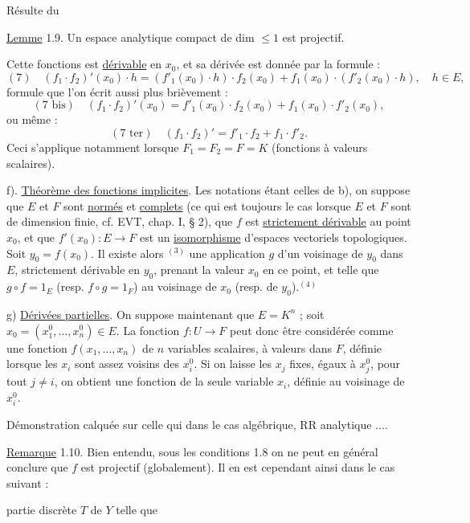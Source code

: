 Résulte du

\uline{Lemme} 1.9. Un espace analytique compact de dim $\leq 1$ est projectif.


Cette fonctions est \uline{dérivable} en $x_0$, et sa dérivée est donnée par la formule :
\[
(7)\quad (f_1\cdot f_2)'(x_0)\cdot h=(f'_1(x_0)\cdot h)\cdot f_2(x_0)+f_1(x_0)\cdot(f'_2(x_0)\cdot h),\quad h\in E,
\]
formule que l'on écrit aussi plus brièvement :
\[
(7\text{ bis})\quad (f_1\cdot f_2)'(x_0)=f'_1(x_0)\cdot f_2(x_0)+f_1(x_0)\cdot f'_2(x_0),
\]
ou même :
\[
(7\text{ ter})\quad (f_1\cdot f_2)'=f'_1\cdot f_2+f_1\cdot f'_2.
\]
Ceci s'applique notamment lorsque $F_1=F_2=F=K$ (fonctions à valeurs scalaires).

f). \uline{Théorème des fonctions implicites}. Les notations étant celles de b), on suppose que $E$ et $F$ sont \uline{normés} et \uline{complets} (ce qui est toujours le cas lorsque $E$ et $F$ sont de dimension finie, cf. EVT, chap. I, § 2), que $f$ est \uline{strictement dérivable} au point $x_0$, et que $f'(x_0):E\longrightarrow F$ est un \uline{isomorphisme} d'espaces vectoriels topologiques. Soit $y_0=f(x_0)$. Il existe alors $^{(3)}$ une application $g$ d'un voisinage de $y_0$ dans $E$, strictement dérivable en $y_0$, prenant la valeur $x_0$ en ce point, et telle que $g\circ f=1_E$ (resp. $f\circ g=1_F$) au voisinage de $x_0$ (resp. de $y_0$).$^{(4)}$

g) \uline{Dérivées partielles}. On suppose maintenant que $E=K^n$ ; soit $x_0=(x_1^0,\ldots,x_n^0)\in E$. La fonction $f:U\to F$ peut donc être considérée comme une fonction $f(x_1,\ldots,x_n)$ de $n$ variables scalaires, à valeurs dans $F$, définie lorsque les $x_i$ sont assez voisins des $x_i^0$. Si on laisse les $x_j$ fixes, égaux à $x_j^0$, pour tout $j\neq i$, on obtient une fonction de la seule variable $x_i$, définie au voisinage de $x_i^0$.


Démonstration calquée sur celle qui  dans le cas algébrique,  RR analytique ....

\uline{Remarque} 1.10. Bien entendu, sous les conditions 1.8  on ne peut en général conclure que $f$ est projectif (globalement). Il en est cependant ainsi dans le cas suivant :

partie discrète $T$ de $Y$ telle que

